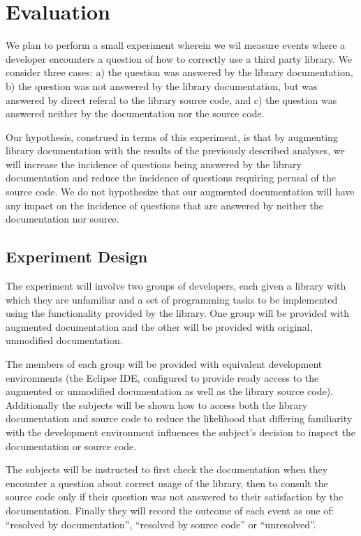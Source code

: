 \section{Evaluation}
\label{sec:Evaluation}

We plan to perform a small experiment wherein we wil measure events where a
developer encounters a question of how to correctly use a third party library.
We consider three cases: a) the question was answered by the library
documentation, b) the question was not answered by the library documentation,
but was answered by direct referal to the library source code, and c) the
question was answered neither by the documentation nor the source code.

Our hypothesis, construed in terms of this experiment, is that by augmenting
library documentation with the results of the previously described analyses, we
will increase the incidence of questions being answered by the library
documentation and reduce the incidence of questions requiring perusal of the
source code. We do not hypothesize that our augmented documentation will have
any impact on the incidence of questions that are answered by neither the
documentation nor source.

\subsection{Experiment Design}
The experiment will involve two groups of developers, each given a library with
which they are unfamiliar and a set of programming tasks to be implemented
using the functionality provided by the library. One group will be provided
with augmented documentation and the other will be provided with original,
unmodified documentation.

The members of each group will be provided with equivalent development
environments (the Eclipse IDE, configured to provide ready access to the
augmented or unmodified documentation as well as the library source code).
Additionally the subjects will be shown how to access both the library
documentation and source code to reduce the likelihood that differing
familiarity with the development environment influences the subject's decision
to inspect the documentation or source code.

The subjects will be instructed to first check the documentation when they
encounter a question about correct usage of the library, then to consult the
source code only if their question was not answered to their satisfaction by
the documentation. Finally they will record the outcome of each event as one
of: ``resolved by documentation'', ``resolved by source code'' or
``unresolved''.

